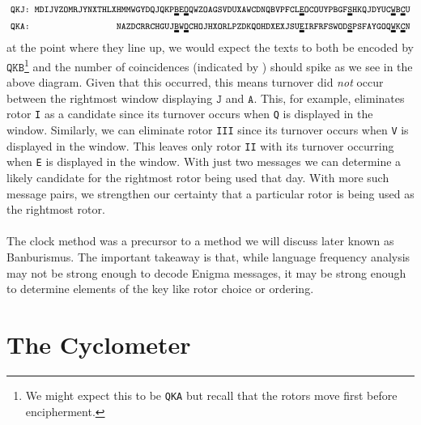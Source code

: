 \begin{align*}
  &\footnotesize\texttt{QKJ: MDIJVZOMRJYNXTHLXHMMWGYDQJQKP}\dunderline{2pt}{\texttt{B}}\texttt{E}\dunderline{2pt}{\texttt{O}}\texttt{QWZOAGSVDUXAWCDNQBVPFCL}\dunderline{2pt}{\texttt{E}}\texttt{OCOUYPBGF}\dunderline{2pt}{\texttt{S}}\texttt{HKQJDYUC}\dunderline{2pt}{\texttt{W}}\texttt{B}\dunderline{2pt}{\texttt{C}}\texttt{U}
  \\
  &\footnotesize\texttt{QKA:\ \ \ \ \ \ \ \ \ \ \ \ \ \ \ \ \ \                 NAZDCRRCHGUJ}\dunderline{2pt}{\texttt{B}}\texttt{W}\dunderline{2pt}{\texttt{O}}\texttt{CHOJHXORLPZDKQOHDXEXJSU}\dunderline{2pt}{\texttt{E}}\texttt{IRFRFSWOD}\dunderline{2pt}{\texttt{S}}\texttt{PSFAYGOQ}\dunderline{2pt}{\texttt{W}}\texttt{K}\dunderline{2pt}{\texttt{C}}\texttt{N}
\end{align*}
at the point where they line up, we would expect the texts to both be encoded by
$\texttt{QKB}$\footnote{We might expect this to be \texttt{QKA} but recall that the rotors move first before encipherment.} and the number of coincidences (indicated by \dunderline{2pt}{\texttt{ }}) should spike as we see in the above diagram. Given that
this occurred, this means turnover did \emph{not} occur between the rightmost window displaying $\texttt{J}$ and
$\texttt{A}$. This, for example, eliminates rotor \texttt{I} as a
candidate since its turnover occurs when \texttt{Q} is displayed in
the window. Similarly, we can eliminate rotor \texttt{III} since its turnover occurs when \texttt{V} is displayed in the window. This leaves only rotor \texttt{II} with its turnover occurring when \texttt{E} is displayed in the window. With just two messages we can determine a likely candidate for the rightmost rotor being used that day. With more such message pairs, we strengthen our certainty that a particular rotor is being used as the rightmost rotor.
\\\\The clock method was
a precursor to a method we will discuss later known as Banburismus.
The important takeaway is that, while language frequency analysis may not be
strong enough to decode Enigma messages, it may be strong enough to
determine elements of the key like rotor choice or ordering.

\section{The Cyclometer}\label{cyclometer}


